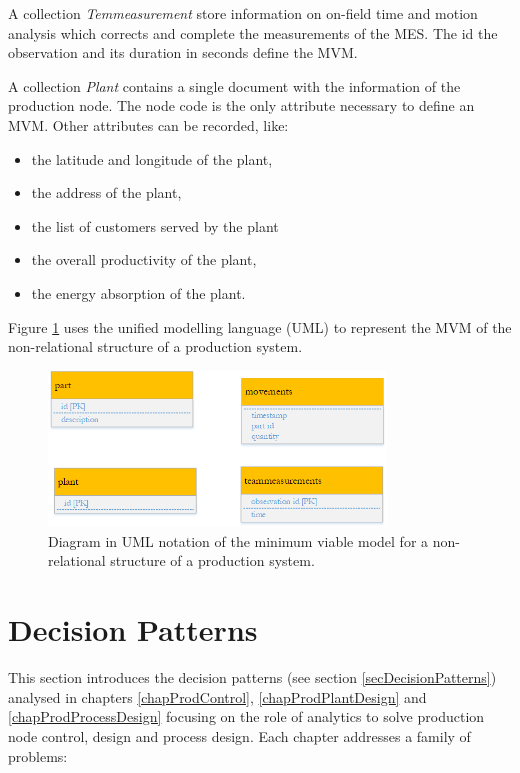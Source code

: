 A collection \textit{Temmeasurement} store information on on-field time and motion analysis which corrects and complete the measurements of the MES. The id the observation and its duration in seconds define the MVM. \par
A collection \textit{Plant} contains a single document with the information of the production node. The node code is the only attribute necessary to define an MVM. Other attributes can be recorded, like:

\begin{itemize}
    \item the latitude and longitude of the plant,
    \item the address of the plant,
    \item the list of customers served by the plant
    \item the overall productivity of the plant,
    \item the energy absorption of the plant.
\end{itemize}

Figure \ref{fig_MVM_prod} uses the unified modelling language (UML) to represent the MVM of the non-relational structure of a production system.

\begin{figure}[hbt!]
\centering
\includegraphics[width=0.8\textwidth]{sectionProduction/diagnosticModels_figures/fig_MVM_prod.png}
\captionsetup{type=figure}
\caption{Diagram in UML notation of the minimum viable model for a non-relational structure of a production system.}
\label{fig_MVM_prod}
\end{figure}


\section{Decision Patterns}
This section introduces the decision patterns (see section \ref{secDecisionPatterns}) analysed in chapters \ref{chapProdControl}, \ref{chapProdPlantDesign} and \ref{chapProdProcessDesign} focusing on the role of analytics to solve production node control, design and process design. Each chapter addresses a family of problems:

